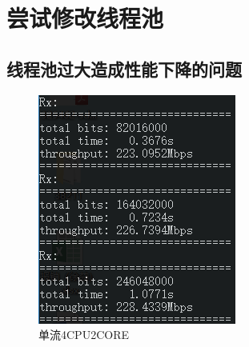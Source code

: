 \documentclass{article}
\begin{document}
\section{尝试修改线程池}
\subsection{线程池过大造成性能下降的问题}
\begin{figure}[H]
	\centering
	\begin{minipage}[t]{0.48\textwidth}
		\centering
		\includegraphics[width = \textwidth]{rxs42.png}
		\caption{单流4CPU2CORE}
	\end{minipage}
	\begin{minipage}[t]{0.48\textwidth}
		\centering

\end{minipage}
\end{figure}
\end{document}
